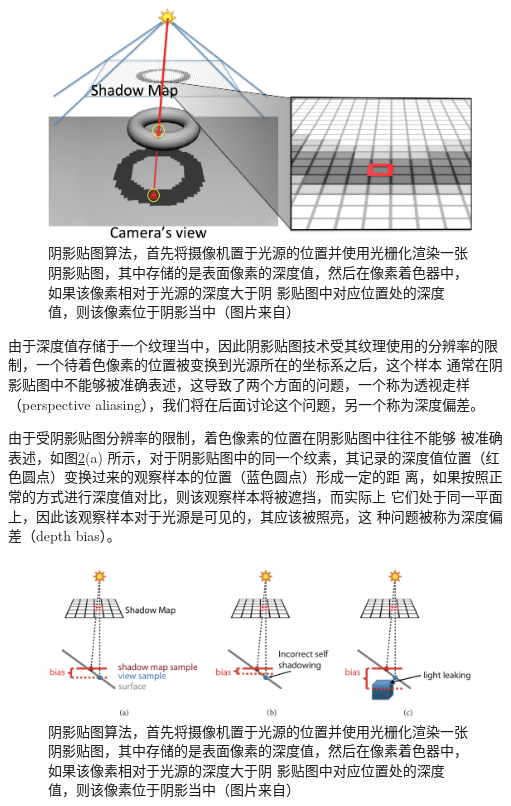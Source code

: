 \begin{figure}
	\includegraphics[width=\textwidth]{figures/shadows/shadow-map}
	\caption{阴影贴图算法，首先将摄像机置于光源的位置并使用光栅化渲染一张阴影贴图，其中存储的是表面像素的深度值，然后在像素着色器中，如果该像素相对于光源的深度大于阴 影贴图中对应位置处的深度值，则该像素位于阴影当中（图片来自\cite{b:rts}）}
	\label{f:df-shadow-map}
\end{figure}

由于深度值存储于一个纹理当中，因此阴影贴图技术受其纹理使用的分辨率的限制，一个待着色像素的位置被变换到光源所在的坐标系之后，这个样本 通常在阴影贴图中不能够被准确表述，这导致了两个方面的问题，一个称为透视走样（perspective aliasing），我们将在后面讨论这个问题，另一个称为深度偏差。

由于受阴影贴图分辨率的限制，着色像素的位置在阴影贴图中往往不能够 被准确表述，如图\ref{f:df-depth-bias}(a) 所示，对于阴影贴图中的同一个纹素，其记录的深度值位置（红色圆点）变换过来的观察样本的位置（蓝色圆点）形成一定的距 离，如果按照正常的方式进行深度值对比，则该观察样本将被遮挡，而实际上 它们处于同一平面上，因此该观察样本对于光源是可见的，其应该被照亮，这 种问题被称为深度偏差（depth bias）。

\begin{figure}
	\includegraphics[width=\textwidth]{figures/shadows/depth-bias}
	\caption{阴影贴图算法，首先将摄像机置于光源的位置并使用光栅化渲染一张阴影贴图，其中存储的是表面像素的深度值，然后在像素着色器中，如果该像素相对于光源的深度大于阴 影贴图中对应位置处的深度值，则该像素位于阴影当中（图片来自\cite{b:rts}）}
	\label{f:df-depth-bias}
\end{figure}


